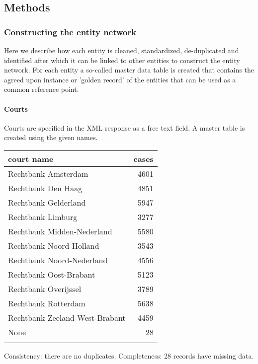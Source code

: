 \subsection{Methods}
\subsubsection{Constructing the entity network}
Here we describe how each entity is cleaned, standardized, de-duplicated and identified after which it can be linked to other entities to construct the entity network. For each entity a so-called master data table is created that contains the agreed upon instance or 'golden record' of the entities that can be used as a common reference point.

\paragraph{Courts}
Courts are specified in the XML response as a free text field. A master table is created using the given names.

\begin{tabular}{lr}
\toprule
                     court name &  cases \\
\midrule
            Rechtbank Amsterdam &   4601 \\
             Rechtbank Den Haag &   4851 \\
           Rechtbank Gelderland &   5947 \\
              Rechtbank Limburg &   3277 \\
     Rechtbank Midden-Nederland &   5580 \\
        Rechtbank Noord-Holland &   3543 \\
      Rechtbank Noord-Nederland &   4556 \\
         Rechtbank Oost-Brabant &   5123 \\
           Rechtbank Overijssel &   3789 \\
            Rechtbank Rotterdam &   5638 \\
 Rechtbank Zeeland-West-Brabant &   4459 \\
                           None &     28 \\
\bottomrule
\label{tabel:court entities}
\end{tabular}

Consistency: there are no duplicates.
Completeness: 28 records have missing data.


